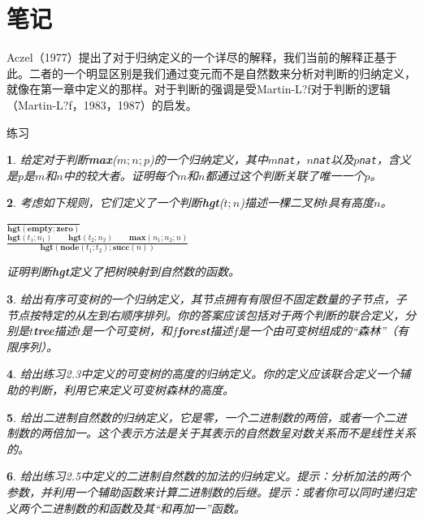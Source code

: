 \section{笔记}
Aczel（1977）提出了对于归纳定义的一个详尽的解释，我们当前的解释正基于此。二者的一个明显区别是我们通过变元而不是自然数来分析对判断的归纳定义，就像在第一章中定义的那样。对于判断的强调是受Martin-L?f对于判断的逻辑（Martin-L?f，1983，1987）的启发。

{\Large 练习}
\newtheorem{excs}{}[chapter]
\begin{excs}
给定对于判断\textbf{max}($m;n;p$)的一个归纳定义，其中$m$\texttt{nat}，$n$\texttt{nat}以及$p$\texttt{nat}，含义是$p$是$m$和$n$中的较大者。证明每个$m$和$n$都通过这个判断关联了唯一一个$p$。
\end{excs}
\begin{excs}
考虑如下规则，它们定义了一个判断\textbf{hgt}($t;n$)描述一棵二叉树$t$具有\textit{高度}$n$。
\begin{center}
$\frac{}{\textbf{hgt}(\textbf{empty};\textbf{zero})}$ \\
$\frac{\textbf{hgt}(t_{1};n_{1})\qquad\textbf{hgt}(t_{2};n_{2})\qquad\textbf{max}(n_{1};n_{2};n)}{\textbf{hgt}(\textbf{node}(t_{1};t_{2});\textbf{succ}(n))}$
\end{center}
证明判断\textbf{hgt}定义了把树映射到自然数的函数。
\end{excs}
\begin{excs}
给出\textit{有序可变树}的一个归纳定义，其节点拥有有限但不固定数量的子节点，子节点按特定的从左到右顺序排列。你的答案应该包括对于两个判断的联合定义，分别是$t$\textbf{tree}描述$t$是一个可变树，和$f$\textbf{forest}描述$f$是一个由可变树组成的“森林”（有限序列）。
\end{excs}
\begin{excs}
给出练习2.3中定义的可变树的高度的归纳定义。你的定义应该联合定义一个辅助的判断，利用它来定义可变树森林的高度。
\end{excs}
\begin{excs}
给出\textit{二进制自然数}的归纳定义，它是零，一个二进制数的两倍，或者一个二进制数的两倍加一。这个表示方法是关于其表示的自然数呈对数关系而不是线性关系的。
\end{excs}
\begin{excs}
给出练习2.5中定义的二进制自然数的加法的归纳定义。\textit{提示}：分析加法的两个参数，并利用一个辅助函数来计算二进制数的后继。\textit{提示}：或者你可以同时递归定义两个二进制数的和函数及其“和再加一”函数。
\end{excs}
